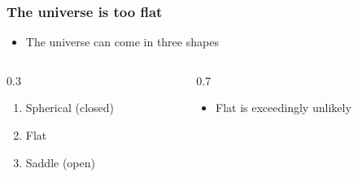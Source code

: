 \begin{frame}
  \frametitle{The universe is too flat}

  \begin{itemize}
    \item<1-> The universe can come in three shapes
  \end{itemize}


  \begin{columns}
    \begin{column}{0.3\textwidth}

      \begin{enumerate}
        \item<3-> Spherical (closed)
        \item<4-> Flat      
        \item<5-> Saddle    (open)
      \end{enumerate}

    \end{column}

    \begin{column}{0.7\textwidth}
      \begin{itemize}
        \item<6-> Flat is exceedingly unlikely
      \end{itemize}

    \end{column}
  \end{columns}

\end{frame}

